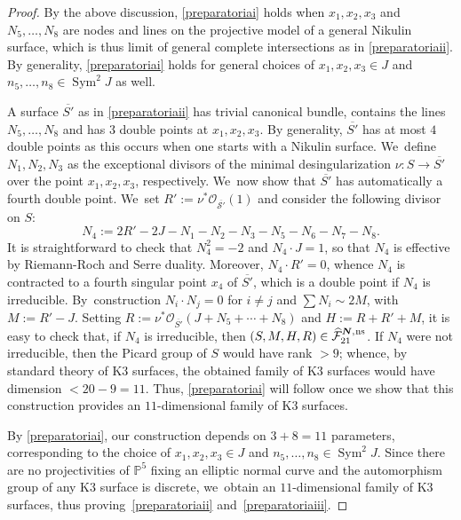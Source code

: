 \documentclass[JEP,XML,SOM,Unicode,NoEqCountersInSection,published]{cedram}
\newcommand{\ns}{{\mkern1mu\mathrm{ns}}}
\newcommand{\bN}{\boldsymbol{N}}
\theoremstyle{plain}
\theoremstyle{definition}
\DeclareMathOperator{\Sym}{Sym}
\newcommand\PP{{\mathbb P}}
\newcommand\F{{\mathcal F}}
\begin{document}
\begin{proof}
By the above discussion, \eqref{preparatoriai} holds when $x_1,x_2,x_3$ and $N_5,\ldots,N_8$ are nodes and lines on the projective model of a general Nikulin surface, which is thus limit of general complete intersections as in \eqref{preparatoriaii}. By generality, \eqref{preparatoriai} holds for general choices of $x_1,x_2,x_3\in J$ and $n_5,\ldots,n_8\in \Sym^2J$ as well.

A surface $\overline{S'}$ as in \eqref{preparatoriaii} has trivial canonical bundle, contains the lines $N_5,\ldots, N_8$ and has $3$ double points at $x_1,x_2,x_3$. By generality, $\overline{S'}$ has at most $4$ double points as this occurs when one starts with a Nikulin surface. We~define $N_1,N_2,N_3$ as the exceptional divisors of the minimal desingularization $\nu:S\to \overline{S'}$ over the point $x_1,x_2,x_3$, respectively. We~now show that $\overline{S'}$ has automatically a fourth double point. We~set $R':=\nu^*\mathcal{O_{\overline{S'}}}(1)$ and consider the following divisor on $S$:
\[
N_4:=2R'-2J-N_1-N_2-N_3-N_5-N_6-N_7-N_8.
\]
It is straightforward to check that $N_4^2=-2$ and $N_4 \cdot J=1$, so that $N_4$ is effective by Riemann-Roch and Serre duality. Moreover,
$N_4\cdot R'=0$, whence $N_4$ is contracted to a fourth singular point $x_4$ of $\overline{S'}$, which is a double point if $N_4$ is irreducible. By~construction $N_i\cdot N_j=0$ for $i\neq j$ and $\sum N_i \sim 2M$, with $M:=R'-J$. Setting $R:=\nu^*\mathcal{O}_{\overline{S'}}(J+N_5+\cdots+N_8)$ and $H:=R+R'+M$, it is easy to check that, if $N_4$ is irreducible, then $(S,M,H,R)\in \widehat{\F}_{21}^{\bN,\ns}$. If $N_4$ were not irreducible, then the Picard group of $S$ would have rank $>9$; whence, by standard theory of K3 surfaces, the obtained family of K3 surfaces would have dimension $<20-9=11$. Thus, \eqref{preparatoriai} will follow once we show that this construction provides an $11$-dimensional family of K3 surfaces.

By \eqref{preparatoriai}, our construction depends on $3+8=11$ parameters, corresponding to the choice of $x_1,x_2,x_3\in J$ and $n_5,\ldots,n_8\in\Sym^2J$. Since there are no projectivities of $\PP^5$ fixing an elliptic normal curve and the automorphism group of any K3 surface is discrete, we~obtain an $11$-dimensional family of K3 surfaces, thus proving~\eqref{preparatoriaii} and~\eqref{preparatoriaiii}.
\end{proof}
\end{document}
